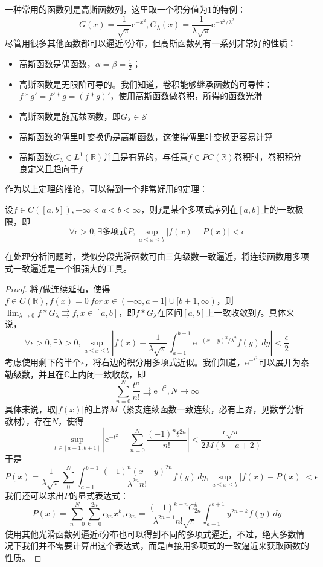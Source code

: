 \documentclass{ctexbook}
\begin{document}
一种常用的函数列是高斯函数列，这里取一个积分值为1的特例：
\[G(x)=\frac{1}{\sqrt{\pi}}\mathrm{e}^{-x^2},G_\lambda(x)=\frac{1}{\lambda\sqrt{\pi}}\mathrm{e}^{-x^2/\lambda^2}\]
尽管用很多其他函数都可以逼近$\delta$分布，但高斯函数列有一系列非常好的性质：\begin{itemize}
    \item 高斯函数是偶函数，$\alpha=\beta=\frac{1}{2}$；
    \item 高斯函数是无限阶可导的。我们知道，卷积能够继承函数的可导性：$f*g'=f'*g=(f*g)'$，使用高斯函数做卷积，所得的函数光滑
    \item 高斯函数是施瓦兹函数，即$G_\lambda\in \mathcal{S}$
    \item 高斯函数的傅里叶变换仍是高斯函数，这使得傅里叶变换更容易计算
    \item 高斯函数$G_\lambda\in L^1(\mathbb{R})$并且是有界的，与任意$f\in PC(\mathbb{R})$卷积时，卷积积分良定义且趋向于$f$
\end{itemize}

作为以上定理的推论，可以得到一个非常好用的定理：\begin{corollary}[*魏尔斯特拉斯逼近定理]
    设$f\in C([a,b]),-\infty<a<b<\infty$，则$f$是某个多项式序列在$[a,b]$上的一致极限，即\[\forall \epsilon>0,\exists \text{多项式}P,\sup_{a\leq x\leq b}|f(x)-P(x)|<\epsilon\]
\end{corollary}
在处理分析问题时，类似分段光滑函数可由三角级数一致逼近，将连续函数用多项式一致逼近是一个很强大的工具。
\begin{proof}
    将$f$做连续延拓，使得$f\in C(\mathbb{R}),f(x)=0\ for\ x\in (-\infty,a-1]\cup[b+1,\infty)$，则$\lim_{\lambda\to 0}f*G_\lambda \rightrightarrows f,x\in[a,b]$，即$f*G_\lambda$在区间$[a,b]$上一致收敛到$f$。具体来说，
    \[\forall \epsilon>0,\exists \lambda>0,\sup_{a\leq x\leq b}\left|f(x)-\frac{1}{\lambda\sqrt{\pi}}\int_{a-1}^{b+1}\mathrm{e}^{-(x-y)^2/\lambda^2}f(y)\,dy\right|<\frac{\epsilon}{2}\]
    考虑使用剩下的半个$\epsilon$，将右边的积分用多项式近似。我们知道，$\mathrm{e}^{-t^2}$可以展开为泰勒级数，并且在$\mathbb{C}$上内闭一致收敛，即
    \[\sum_{n=0}^{N}\frac{t^n}{n!}\rightrightarrows \mathrm{e}^{-t^2},N\to\infty\]
    具体来说，取$|f(x)|$的上界$M$（紧支连续函数一致连续，必有上界，见数学分析教材），存在$N$，使得
    \[\sup_{t\in[a-1,b+1]}\left|\mathrm{e}^{-t^2}-\sum_{n=0}^{N}\frac{(-1)^n t^{2n}}{n!}\right|<\frac{\epsilon\sqrt{\pi}}{2M(b-a+2)}\]
    于是
    \[P(x)=\frac{1}{\lambda\sqrt{\pi}}\sum_{0}^{N}\int_{a-1}^{b+1}\frac{(-1)^n (x-y)^{2n}}{\lambda^{2n}n!}f(y)\,dy,\sup_{a\leq x\leq b}\left|f(x)-P(x)\right|<\epsilon\]
    我们还可以求出$P$的显式表达式：
    \[P(x)=\sum_{n=0}^{N}\sum_{k=0}^{2n}c_{kn}x^k,c_{kn}=\frac{(-1)^{k-n}C_{2n}^{k}}{\lambda^{2n+1}n!\sqrt{\pi}}\int_{a-1}^{b+1}y^{2n-k}f(y)\,dy\]
    使用其他光滑函数列逼近$\delta$分布也可以得到不同的多项式逼近，不过，绝大多数情况下我们并不需要计算出这个表达式，而是直接用多项式的一致逼近来获取函数的性质。
\end{proof}
\end{document}
